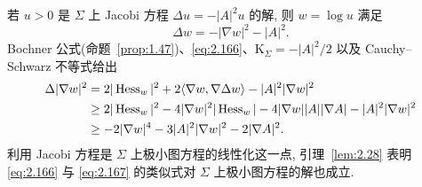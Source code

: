 若 $u>0$ 是 $\Sigma$ 上 Jacobi 方程 $\Delta u=-|A|^{2}u$ 的解, 则 $w=\log u$
满足
\begin{equation}
\Delta w=-|\nabla w|^{2}-|A|^{2}.
\label{eq:2.166}
\end{equation}
Bochner 公式(命题~\ref{prop:1.47})、\eqref{eq:2.166}、$\mathrm{K}_{\Sigma}=-|A|^{2}/2$
以及 Cauchy--Schwarz 不等式给出
\begin{equation}
\begin{aligned}
\Delta|\nabla w|^{2}
&=2|\operatorname{Hess}_w|^{2}+2\langle\nabla w,\nabla\Delta w\rangle-|A|^{2}|\nabla w|^{2}\\
&\geq2|\operatorname{Hess}_w|^{2}-4|\nabla w|^{2}|\operatorname{Hess}_w|
 -4|\nabla w||A||\nabla A|-|A|^{2}|\nabla w|^{2}\\
&\geq-2|\nabla w|^{4}-3|A|^{2}|\nabla w|^{2}-2|\nabla A|^{2}.
\end{aligned}
\label{eq:2.167}
\end{equation}
利用 Jacobi 方程是 $\Sigma$ 上极小图方程的线性化这一点, 引理~\ref{lem:2.28}
表明 \eqref{eq:2.166} 与 \eqref{eq:2.167} 的类似式对 $\Sigma$ 上极小图方程的解也成立.

